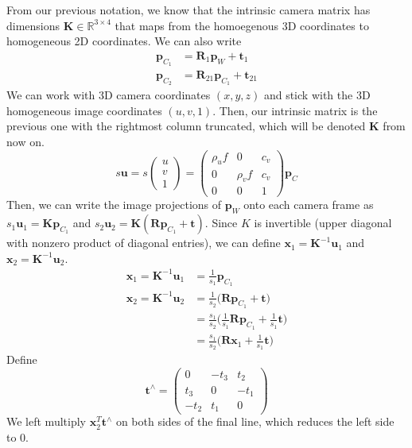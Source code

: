 \documentclass{article}
\theoremstyle{definition}
\theoremstyle{remark}
\theoremstyle{definition}
\begin{document}
From our previous notation, we know that the intrinsic camera matrix has dimensions $\mathbf{K} \in \mathbb{R}^{3 \times 4}$ that maps from the homoegenous 3D coordinates to homogeneous 2D coordinates. We can also write 
\begin{align*}
    \mathbf{p}_{C_1} & = \mathbf{R}_1 \mathbf{p}_W + \mathbf{t}_1 \\ 
    \mathbf{p}_{C_2} & = \mathbf{R}_{21} \mathbf{p}_{C_1} + \mathbf{t}_{21}
\end{align*}
We can work with 3D camera coordinates $(x, y, z)$ and stick with the 3D homogeneous image coordinates $(u, v, 1)$. Then, our intrinsic matrix is the previous one with the rightmost column truncated, which will be denoted $\mathbf{K}$ from now on. 
\[s \mathbf{u} = s \begin{pmatrix} u \\ v \\ 1 \end{pmatrix} = \begin{pmatrix} \rho_u f & 0 & c_v \\ 0 & \rho_v f & c_v \\ 0 & 0 & 1 \end{pmatrix} \mathbf{p}_C\]
Then, we can write the image projections of $\mathbf{p}_W$ onto each camera frame as $s_1 \mathbf{u}_1 = \mathbf{K} \mathbf{p}_{C_1}$ and $s_2 \mathbf{u}_2 = \mathbf{K} (\mathbf{R} \mathbf{p}_{C_1} + \mathbf{t})$. Since $K$ is invertible (upper diagonal with nonzero product of diagonal entries), we can define $\mathbf{x}_1 = \mathbf{K}^{-1} \mathbf{u}_1$ and $\mathbf{x}_2 = \mathbf{K}^{-1} \mathbf{u}_2$. 
\begin{align*}
    \mathbf{x}_1 = \mathbf{K}^{-1} \mathbf{u}_1 & = \frac{1}{s_1} \mathbf{p}_{C_1} \\ 
    \mathbf{x}_2 = \mathbf{K}^{-1} \mathbf{u}_2 & = \frac{1}{s_2} \big( \mathbf{R} \mathbf{p}_{C_1} + \mathbf{t} \big) \\
    & = \frac{s_1}{s_2} \bigg( \frac{1}{s_1} \mathbf{R} \mathbf{p}_{C_1} + \frac{1}{s_1} \mathbf{t} \bigg) \\
    & = \frac{s_1}{s_2} \big( \mathbf{R} \mathbf{x}_1 + \frac{1}{s_1} \mathbf{t} \big) 
\end{align*}
Define 
\[\mathbf{t}^\wedge = \begin{pmatrix} 0 & -t_3 & t_2 \\ t_3 & 0 & -t_1 \\ -t_2 & t_1 & 0 \end{pmatrix}\]
We left multiply $\mathbf{x}_2^T \mathbf{t}^\wedge$ on both sides of the final line, which reduces the left side to $0$. 
\end{document}
